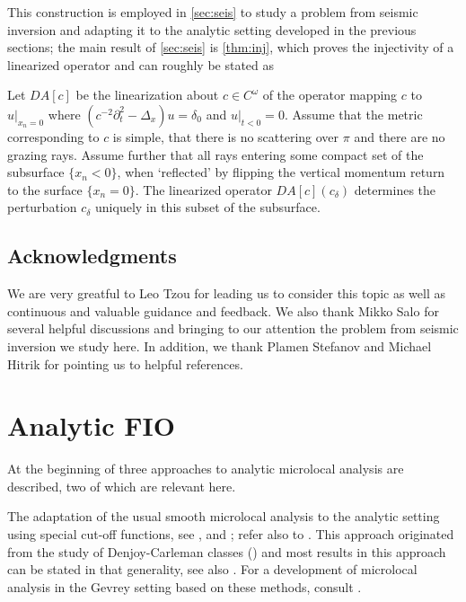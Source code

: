 \documentclass[
	fontsize=11pt, 
	twoside=false, 
	abstract=true, 
	a4paper,
]{scrartcl}
\newcommand{\del}{\partial}
\begin{document}
This construction is employed in \cref{sec:seis} to study a problem from seismic inversion and adapting it to the analytic setting %
developed in the previous sections; the main result of \cref{sec:seis} is \cref{thm:inj}, which proves the injectivity of a linearized operator and can roughly be stated as
\begin{theorem*}
	Let $DA[c]$ be the linearization about $c\in C^\omega$ of the operator mapping $c$ to $u\vert_{x_n=0}$ where $(c^{-2}\del_t^2 -\Delta_x)u=\delta_0$ and $u\vert_{t<0}=0$. Assume that the metric corresponding to $c$ is simple, that there is no scattering over $\pi$ and there are no grazing rays. Assume further that all rays entering some compact set of the subsurface $\{x_n<0\}$, when `reflected' by flipping the vertical momentum return to the surface $\{x_n=0\}$. The linearized operator $DA[c](c_\delta)$ determines the perturbation $c_\delta$ uniquely in this subset of the subsurface.
\end{theorem*}

\subsection*{Acknowledgments}
We are very greatful to Leo Tzou for leading us to consider this topic as well as continuous and valuable guidance and feedback. We also thank Mikko Salo for several helpful discussions and bringing to our attention the problem from seismic inversion we study here. In addition, we thank Plamen Stefanov and Michael Hitrik for pointing us to helpful references.

\section{Analytic FIO}\label{sec:analyticFIO}

At the beginning of \cite[\S~2]{zbMATH07060662} three approaches to analytic microlocal analysis are described, two of which are relevant here. 

The adaptation of the usual smooth microlocal analysis to the analytic setting using special cut-off functions, see \cite{zbMATH03359011}, \cite[\S~8.5]{hoermander1} and \cite[Part~V]{MR4436039}; refer also to \cite{MR597144,MR597145}. This approach originated from the study of Denjoy-Carleman classes (\cite{zbMATH03219638,zbMATH03233077}) and most results in this approach can be stated in that generality, see also \cite{zbMATH07264015}. For a development of microlocal analysis in the Gevrey setting based on these methods, consult \cite{doi:10.1142/1550,zbMATH04105482}.
\end{document}
